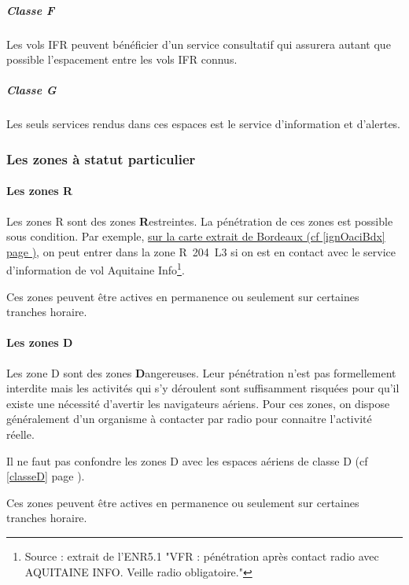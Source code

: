 		\subparagraph{Classe F}
		Les vols IFR peuvent bénéficier d'un service consultatif qui assurera autant que possible l'espacement entre les vols IFR connus. 
		
		
		\subparagraph{Classe G}
		Les seuls services rendus dans ces espaces est le service d'information et d'alertes.
		
		
		\subsubsection{Les zones à statut particulier}
			\paragraph{Les zones R}
			Les zones R sont des zones \textbf{R}estreintes. La pénétration de ces zones est possible sous condition. Par exemple, \hyperlink{ignOaciBordeaux.1}{sur la carte extrait de Bordeaux (cf \ref{ignOaciBdx} page \pageref{ignOaciBdx})}, on peut entrer dans la zone R~204~L3 si on est en contact avec le service d'information de vol Aquitaine Info\footnote{Source : extrait de l'ENR5.1 "VFR : pénétration après contact radio avec AQUITAINE INFO. Veille radio obligatoire."}.
			
			Ces zones peuvent être actives en permanence ou seulement sur certaines tranches horaire.
			
			\paragraph{Les zones D}
			Les zone D sont des zones \textbf{D}angereuses. Leur pénétration n'est pas formellement interdite mais les activités qui s'y déroulent sont suffisamment risquées pour qu'il existe une nécessité d'avertir les navigateurs aériens. Pour ces zones, on dispose généralement d'un organisme à contacter par radio pour connaitre l'activité réelle.
			
			\alert{Il ne faut pas confondre les zones D avec les espaces aériens de classe D (cf \ref{classeD} page \pageref{classeD}).}
			
			Ces zones peuvent être actives en permanence ou seulement sur certaines tranches horaire.
			
